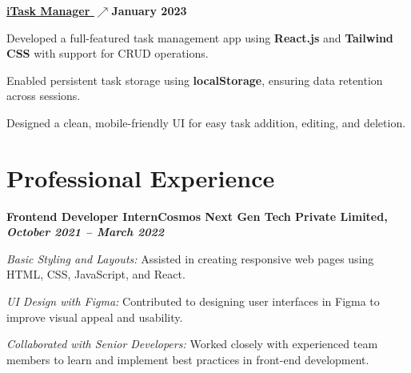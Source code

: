 \documentclass[letterpaper,10pt]{article}
\newcommand{\heading}[2]{
  \hspace{10pt}#1\hfill#2\\
}
\newcommand{\headingBf}[2]{
  \heading{\textbf{#1}}{\textbf{#2}}
}
\newenvironment{resume_list}{
  \vspace{-7pt}
  \begin{itemize}[itemsep=-2px, parsep=1pt, leftmargin=30pt]
}{
  \end{itemize}
}
\begin{document}
\headingBf {\underline{\href{https://calm-zuccutto-519f2d.netlify.app/}{iTask Manager \(\nearrow\)}}}{January 2023}  \vspace{4pt}
\begin{resume_list}
    \item Developed a full-featured task management app using \textbf{React.js} and \textbf{Tailwind CSS} with support for CRUD operations.
    \item Enabled persistent task storage using \textbf{localStorage}, ensuring data retention across sessions.
    \item Designed a clean, mobile-friendly UI for easy task addition, editing, and deletion.
\end{resume_list}





  \section{Professional Experience}

  \headingBf{Frontend Developer Intern}{Cosmos Next Gen Tech Private Limited, \textit{October 2021 -- March 2022}}  \vspace{3pt}
  \begin{resume_list}
    \item \textit{Basic Styling and Layouts:} Assisted in creating responsive web pages using HTML, CSS, JavaScript, and React.
    \item \textit{UI Design with Figma:} Contributed to designing user interfaces in Figma to improve visual appeal and usability.
    \item \textit{Collaborated with Senior Developers:} Worked closely with experienced team members to learn and implement best practices in front-end development.
  \end{resume_list}
\end{document}
